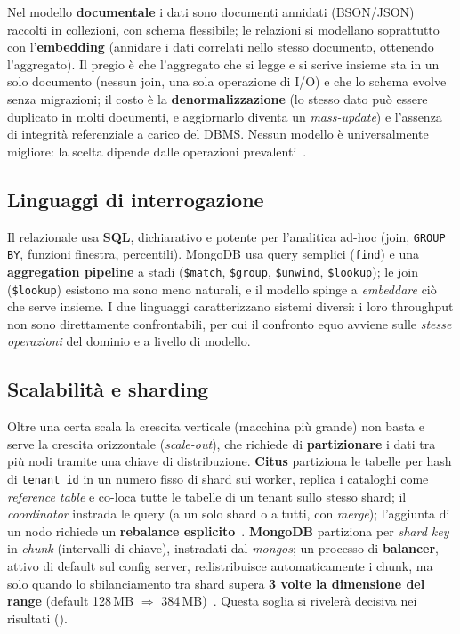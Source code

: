 Nel modello \textbf{documentale} i dati sono documenti annidati (BSON/JSON) raccolti in collezioni, con
schema flessibile; le relazioni si modellano soprattutto con l'\textbf{embedding} (annidare i dati correlati
nello stesso documento, ottenendo l'aggregato). Il pregio è che l'aggregato che si legge e si scrive insieme
sta in un solo documento (nessun join, una sola operazione di I/O) e che lo schema evolve senza migrazioni;
il costo è la \textbf{denormalizzazione} (lo stesso dato può essere duplicato in molti documenti, e
aggiornarlo diventa un \emph{mass-update}) e l'assenza di integrità referenziale a carico del DBMS. Nessun
modello è universalmente migliore: la scelta dipende dalle operazioni prevalenti~\cite{stonebraker2005onesize}.

\subsection{Linguaggi di interrogazione}
Il relazionale usa \textbf{SQL}, dichiarativo e potente per l'analitica ad-hoc (join, \texttt{GROUP BY},
funzioni finestra, percentili). MongoDB usa query semplici (\texttt{find}) e una \textbf{aggregation
pipeline} a stadi (\texttt{\$match}, \texttt{\$group}, \texttt{\$unwind}, \texttt{\$lookup}); le join
(\texttt{\$lookup}) esistono ma sono meno naturali, e il modello spinge a \emph{embeddare} ciò che serve
insieme. I due linguaggi caratterizzano sistemi diversi: i loro throughput non sono direttamente
confrontabili, per cui il confronto equo avviene sulle \emph{stesse operazioni} del dominio e a livello di
modello.

\subsection{Scalabilità e sharding}
Oltre una certa scala la crescita verticale (macchina più grande) non basta e serve la crescita orizzontale
(\emph{scale-out}), che richiede di \textbf{partizionare} i dati tra più nodi tramite una chiave di
distribuzione. \textbf{Citus} partiziona le tabelle per hash di \texttt{tenant\_id} in un numero fisso di
shard sui worker, replica i cataloghi come \emph{reference table} e co-loca tutte le tabelle di un tenant
sullo stesso shard; il \emph{coordinator} instrada le query (a un solo shard o a tutti, con \emph{merge});
l'aggiunta di un nodo richiede un \textbf{rebalance esplicito}~\cite{citusdocs}.
\textbf{MongoDB} partiziona per \emph{shard key} in \emph{chunk} (intervalli di chiave), instradati dal
\emph{mongos}; un processo di \textbf{balancer}, attivo di default sul config server, redistribuisce
automaticamente i chunk, ma solo quando lo sbilanciamento tra shard supera \textbf{3 volte la dimensione del
range} (default 128\,MB $\Rightarrow$ 384\,MB)~\cite{mongodbmanual}. Questa soglia si rivelerà decisiva nei
risultati ().

